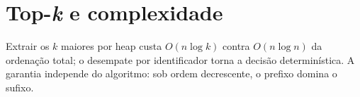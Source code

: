 \section{Top-\textit{k} e complexidade}
Extrair os $k$ maiores por heap custa $O(n\log k)$ contra $O(n\log n)$ da ordenação total; o desempate por identificador torna a decisão determinística. A garantia independe do algoritmo: sob ordem decrescente, o prefixo domina o sufixo.
